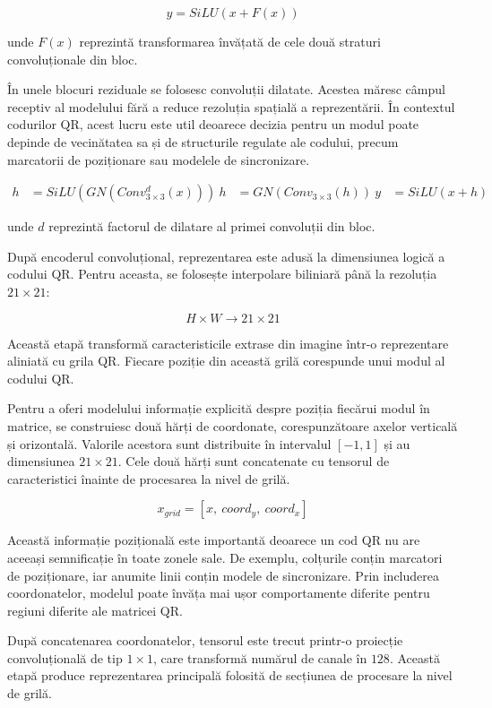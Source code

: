 \[
y = SiLU(x + F(x))
\]

unde $F(x)$ reprezintă transformarea învățată de cele două straturi convoluționale din bloc.

În unele blocuri reziduale se folosesc convoluții dilatate. Acestea măresc câmpul receptiv al modelului fără a reduce rezoluția spațială a reprezentării. În contextul codurilor QR, acest lucru este util deoarece decizia pentru un modul poate depinde de vecinătatea sa și de structurile regulate ale codului, precum marcatorii de poziționare sau modelele de sincronizare.

\[
\begin{aligned}
h &= SiLU(GN(Conv_{3 \times 3}^{d}(x))) \
h &= GN(Conv_{3 \times 3}(h)) \
y &= SiLU(x + h)
\end{aligned}
\]

unde $d$ reprezintă factorul de dilatare al primei convoluții din bloc.

După encoderul convoluțional, reprezentarea este adusă la dimensiunea logică a codului QR. Pentru aceasta, se folosește interpolare biliniară până la rezoluția $21 \times 21$:

\[
H \times W \rightarrow 21 \times 21
\]

Această etapă transformă caracteristicile extrase din imagine într-o reprezentare aliniată cu grila QR. Fiecare poziție din această grilă corespunde unui modul al codului QR.

Pentru a oferi modelului informație explicită despre poziția fiecărui modul în matrice, se construiesc două hărți de coordonate, corespunzătoare axelor verticală și orizontală. Valorile acestora sunt distribuite în intervalul $[-1, 1]$ și au dimensiunea $21 \times 21$. Cele două hărți sunt concatenate cu tensorul de caracteristici înainte de procesarea la nivel de grilă.

\[
x_{grid} = [x,\ coord_y,\ coord_x]
\]

Această informație pozițională este importantă deoarece un cod QR nu are aceeași semnificație în toate zonele sale. De exemplu, colțurile conțin marcatori de poziționare, iar anumite linii conțin modele de sincronizare. Prin includerea coordonatelor, modelul poate învăța mai ușor comportamente diferite pentru regiuni diferite ale matricei QR.

După concatenarea coordonatelor, tensorul este trecut printr-o proiecție convoluțională de tip $1 \times 1$, care transformă numărul de canale în $128$. Această etapă produce reprezentarea principală folosită de secțiunea de procesare la nivel de grilă.

